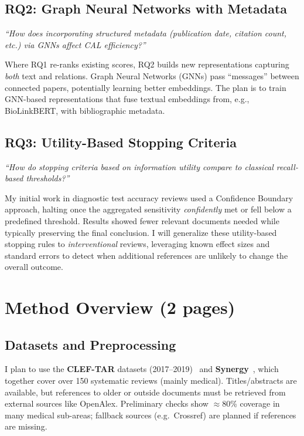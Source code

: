 \documentclass[11pt,a4paper]{article}
\begin{document}
\subsection{RQ2: Graph Neural Networks with Metadata}
\emph{``How does incorporating structured metadata (publication date, citation count, etc.) via GNNs affect CAL efficiency?''}

Where RQ1 re-ranks existing scores, RQ2 builds new representations capturing \emph{both} text and relations. Graph Neural Networks (GNNs) pass ``messages'' between connected papers, potentially learning better embeddings. The plan is to train GNN-based representations that fuse textual embeddings from, e.g., BioLinkBERT, with bibliographic metadata.

\subsection{RQ3: Utility-Based Stopping Criteria}
\emph{``How do stopping criteria based on \emph{information utility} compare to classical recall-based thresholds?''}

My initial work in diagnostic test accuracy reviews used a Confidence Boundary approach, halting once the aggregated sensitivity \emph{confidently} met or fell below a predefined threshold. Results showed fewer relevant documents needed while typically preserving the final conclusion. I will generalize these utility-based stopping rules to \emph{interventional} reviews, leveraging known effect sizes and standard errors to detect when additional references are unlikely to change the overall outcome.

\section{Method Overview (2 pages)}
\subsection{Datasets and Preprocessing}
I plan to use the \textbf{CLEF-TAR} datasets (2017--2019)~\cite{kanoulas_clef_2017, kanoulas_clef_2018, kanoulas_clef_2019} and \textbf{Synergy}~\cite{de_bruin_synergy_2023}, which together cover over 150 systematic reviews (mainly medical). Titles/abstracts are available, but references to older or outside documents must be retrieved from external sources like OpenAlex. Preliminary checks show $\approx$80\% coverage in many medical sub-areas; fallback sources (e.g.\ Crossref) are planned if references are missing.
\end{document}
